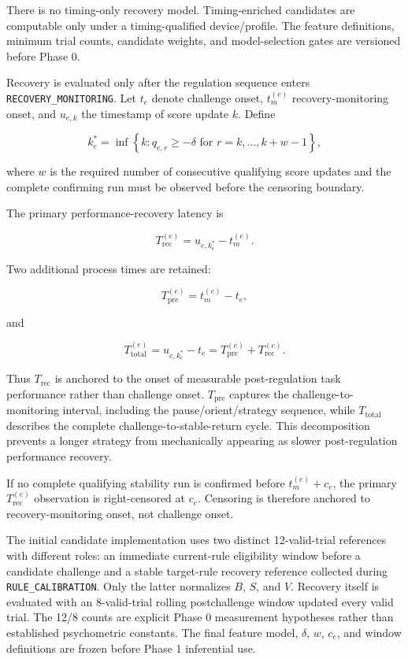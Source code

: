 There is no timing-only recovery model. Timing-enriched candidates are computable only under a timing-qualified device/profile. The feature definitions, minimum trial counts, candidate weights, and model-selection gates are versioned before Phase 0.

Recovery is evaluated only after the regulation sequence enters \texttt{RECOVERY\_MONITORING}. Let \(t_e\) denote challenge onset, \(t_m^{(e)}\) recovery-monitoring onset, and \(u_{e,k}\) the timestamp of score update \(k\). Define

\[
k_e^\ast
=
\inf
\left\{
k:
q_{e,r}\ge-\delta
\text{ for }
r=k,\ldots,k+w-1
\right\},
\]

where \(w\) is the required number of consecutive qualifying score updates and the complete confirming run must be observed before the censoring boundary.

The primary performance-recovery latency is

\[
T_{\mathrm{rec}}^{(e)}
=
u_{e,k_e^\ast}-t_m^{(e)}.
\]

Two additional process times are retained:

\[
T_{\mathrm{pre}}^{(e)}
=
t_m^{(e)}-t_e,
\]

and

\[
T_{\mathrm{total}}^{(e)}
=
u_{e,k_e^\ast}-t_e
=
T_{\mathrm{pre}}^{(e)}+T_{\mathrm{rec}}^{(e)}.
\]

Thus \(T_{\mathrm{rec}}\) is anchored to the onset of measurable post-regulation task performance rather than challenge onset. \(T_{\mathrm{pre}}\) captures the challenge-to-monitoring interval, including the pause/orient/strategy sequence, while \(T_{\mathrm{total}}\) describes the complete challenge-to-stable-return cycle. This decomposition prevents a longer strategy from mechanically appearing as slower post-regulation performance recovery.

If no complete qualifying stability run is confirmed before \(t_m^{(e)}+c_e\), the primary \(T_{\mathrm{rec}}^{(e)}\) observation is right-censored at \(c_e\). Censoring is therefore anchored to recovery-monitoring onset, not challenge onset.

The initial candidate implementation uses two distinct 12-valid-trial references with different roles: an immediate current-rule eligibility window before a candidate challenge and a stable target-rule recovery reference collected during \texttt{RULE\_CALIBRATION}. Only the latter normalizes \(B\), \(S\), and \(V\). Recovery itself is evaluated with an 8-valid-trial rolling postchallenge window updated every valid trial. The 12/8 counts are explicit Phase 0 measurement hypotheses rather than established psychometric constants. The final feature model, \(\delta\), \(w\), \(c_e\), and window definitions are frozen before Phase 1 inferential use.

